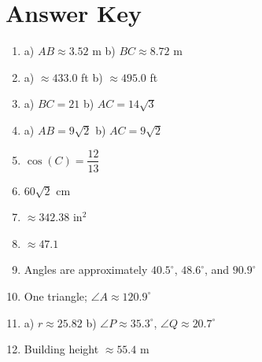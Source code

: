 \documentclass[12pt]{article}
\begin{document}
\section*{Answer Key}
\begin{enumerate}[leftmargin=*, itemsep=0.8em]
  \item a) $AB\approx 3.52$ m \quad b) $BC\approx 8.72$ m
  \item a) $\approx 433.0$ ft \quad b) $\approx 495.0$ ft
  \item a) $BC=21$ \quad b) $AC=14\sqrt{3}$
  \item a) $AB=9\sqrt{2}$ \quad b) $AC=9\sqrt{2}$
  \item $\cos(C)=\dfrac{12}{13}$
  \item $60\sqrt{2}$ cm
  \item $\approx 342.38\text{ in}^2$
  \item $\approx 47.1$
  \item Angles are approximately $40.5^\circ$, $48.6^\circ$, and $90.9^\circ$
  \item One triangle; $\angle A\approx 120.9^\circ$
  \item a) $r\approx 25.82$ \quad b) $\angle P\approx 35.3^\circ$, $\angle Q\approx 20.7^\circ$
  \item Building height $\approx 55.4$ m
\end{enumerate}
\end{document}

